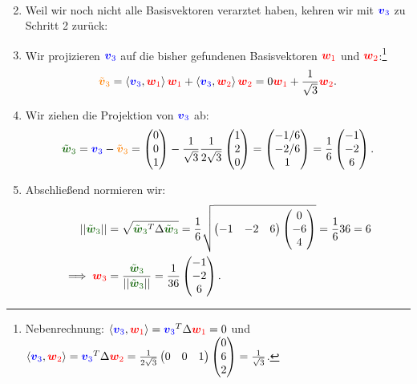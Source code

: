 \begin{Beispiel}
\begin{enumerate}
\begin{align*}
    \end{align*}
    \item Weil wir noch nicht alle Basisvektoren verarztet haben, kehren wir mit $\textcolor{blue}{{{\text{\boldmath${v}$}}}_3}$ zu Schritt 2 zurück:\setcounter{enumi}{1}
    \item Wir projizieren $\textcolor{blue}{{{\text{\boldmath${v}$}}}_3}$ auf die bisher gefundenen Basisvektoren $\textcolor{red}{{{\text{\boldmath${w}$}}}_1}$ und $\textcolor{red}{{{\text{\boldmath${w}$}}}_2}$:\footnote{Nebenrechnung: $\left\langle\textcolor{blue}{{{\text{\boldmath${v}$}}}_3},\textcolor{red}{{{\text{\boldmath${w}$}}}_1}\right\rangle=\textcolor{blue}{{{\text{\boldmath${v}$}}}_3}^T \Delta \textcolor{red}{{{\text{\boldmath${w}$}}}_1}=0$ und $\left\langle\textcolor{blue}{{{\text{\boldmath${v}$}}}_3},\textcolor{red}{{{\text{\boldmath${w}$}}}_2}\right\rangle=\textcolor{blue}{{{\text{\boldmath${v}$}}}_3}^T\Delta \textcolor{red}{{{\text{\boldmath${w}$}}}_2}=\frac{1}{2\sqrt{3}}\begin{pmatrix}0&0&1\end{pmatrix}\begin{pmatrix}0\\6\\2\end{pmatrix}=\frac{1}{\sqrt{3}}$.}
    \begin{equation*}
        \textcolor{orange}{\Tilde{{{\text{\boldmath${v}$}}}}_3}=\left\langle\textcolor{blue}{{{\text{\boldmath${v}$}}}_3},\textcolor{red}{{{\text{\boldmath${w}$}}}_1}\right\rangle\textcolor{red}{{{\text{\boldmath${w}$}}}_1}+\left\langle\textcolor{blue}{{{\text{\boldmath${v}$}}}_3},\textcolor{red}{{{\text{\boldmath${w}$}}}_2}\right\rangle\textcolor{red}{{{\text{\boldmath${w}$}}}_2}=0\textcolor{red}{{{\text{\boldmath${w}$}}}_1}+\frac{1}{\sqrt{3}}\textcolor{red}{{{\text{\boldmath${w}$}}}_2}.
    \end{equation*}
    \item Wir ziehen die Projektion von $\textcolor{blue}{{{\text{\boldmath${v}$}}}_3}$ ab:
    \begin{equation*}
        \textcolor{mygreen}{\Tilde{\wvec}_3}=\textcolor{blue}{\vvec_3}-\textcolor{orange}{\Tilde{\vvec}_3}=\Matrix{0\\0\\1}-\frac{1}{\sqrt{3}}\frac{1}{2\sqrt{3}}\Matrix{1\\2\\0}=\Matrix{-1/6\\-2/6\\1}=\frac{1}{6}\Matrix{-1\\-2\\6}.
    \end{equation*}
    \item Abschließend normieren wir:
    \begin{align*}
        \Norm{\textcolor{mygreen}{\Tilde{\wvec}_3}}&=\sqrt{\textcolor{mygreen}{\Tilde{\wvec}_3}^T\Delta \textcolor{mygreen}{\Tilde{\wvec}_3}}=\frac{1}{6}\sqrt{\Matrix{-1&-2&6}\Matrix{0\\-6\\4}}=\frac{1}{6}36=6\\
    \implies \textcolor{red}{\wvec_3}&=\frac{\textcolor{mygreen}{\Tilde{\wvec}_3}}{\Norm{\textcolor{mygreen}{\Tilde{\wvec}_3}}}=\frac{1}{36}\Matrix{-1\\-2\\6}.  

\end{align*}
\end{enumerate}
\end{Beispiel}
